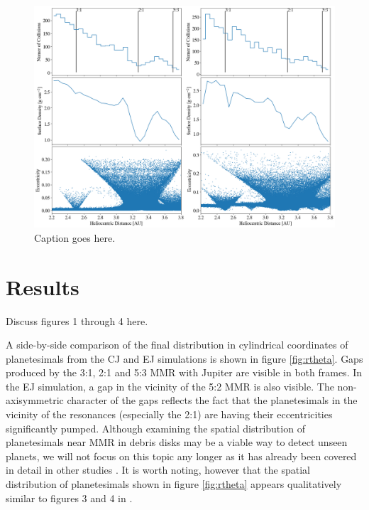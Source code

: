 \documentclass[twocolumn]{aastex63}
\begin{document}
\begin{figure}
    \includegraphics[width=\textwidth]{figures/coll_hist_r.png}
    \caption{Caption goes here.\label{fig:coll_hist_r}}
\end{figure}

\section{Results} \label{sec:results}

Discuss figures 1 through 4 here.

A side-by-side comparison of the final distribution in cylindrical coordinates of planetesimals from the CJ and EJ simulations is shown 
in figure \ref{fig:rtheta}. Gaps produced by the 3:1, 2:1 and 5:3 MMR with Jupiter are visible in both frames. In the EJ simulation, a 
gap in the vicinity of the 5:2 MMR is also visible. The non-axisymmetric character of the gaps reflects the fact that the planetesimals 
in the vicinity of the resonances (especially the 2:1) are having their eccentricities significantly pumped. Although examining the spatial distribution of planetesimals near MMR in debris disks may be a viable way to detect  unseen planets, we will not focus on this topic any longer as it has already been covered in detail in other studies \citep{2016ApJ...818..159T, 2018ApJ...857....3T}. It is worth noting, however that the spatial distribution of planetesimals shown in  figure \ref{fig:rtheta} appears qualitatively similar to figures 3 and 4 in \citep{2016ApJ...818..159T}.
\end{document}

